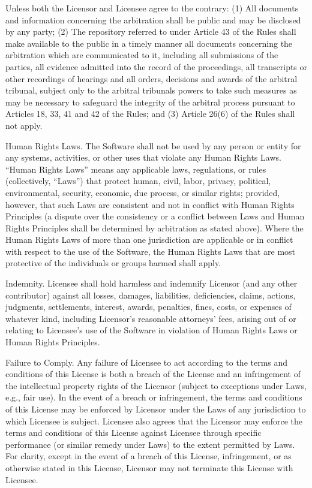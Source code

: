 \begin{DoxyItemize}
\begin{DoxyEnumerate}
Unless both the Licensor and Licensee agree to the contrary:\+ (1) All documents and information concerning the arbitration shall be public and may be disclosed by any party; (2) The repository referred to under Article 43 of the Rules shall make available to the public in a timely manner all documents concerning the arbitration which are communicated to it, including all submissions of the parties, all evidence admitted into the record of the proceedings, all transcripts or other recordings of hearings and all orders, decisions and awards of the arbitral tribunal, subject only to the arbitral tribunal\textquotesingle{}s powers to take such measures as may be necessary to safeguard the integrity of the arbitral process pursuant to Articles 18, 33, 41 and 42 of the Rules; and (3) Article 26(6) of the Rules shall not apply.
\item Human Rights Laws. The Software shall not be used by any person or entity for any systems, activities, or other uses that violate any Human Rights Laws. “\+Human Rights Laws” means any applicable laws, regulations, or rules (collectively, “\+Laws”) that protect human, civil, labor, privacy, political, environmental, security, economic, due process, or similar rights; provided, however, that such Laws are consistent and not in conflict with Human Rights Principles (a dispute over the consistency or a conflict between Laws and Human Rights Principles shall be determined by arbitration as stated above). Where the Human Rights Laws of more than one jurisdiction are applicable or in conflict with respect to the use of the Software, the Human Rights Laws that are most protective of the individuals or groups harmed shall apply.
\item Indemnity. Licensee shall hold harmless and indemnify Licensor (and any other contributor) against all losses, damages, liabilities, deficiencies, claims, actions, judgments, settlements, interest, awards, penalties, fines, costs, or expenses of whatever kind, including Licensor’s reasonable attorneys’ fees, arising out of or relating to Licensee’s use of the Software in violation of Human Rights Laws or Human Rights Principles.
\end{DoxyEnumerate}
\item Failure to Comply. Any failure of Licensee to act according to the terms and conditions of this License is both a breach of the License and an infringement of the intellectual property rights of the Licensor (subject to exceptions under Laws, e.\+g., fair use). In the event of a breach or infringement, the terms and conditions of this License may be enforced by Licensor under the Laws of any jurisdiction to which Licensee is subject. Licensee also agrees that the Licensor may enforce the terms and conditions of this License against Licensee through specific performance (or similar remedy under Laws) to the extent permitted by Laws. For clarity, except in the event of a breach of this License, infringement, or as otherwise stated in this License, Licensor may not terminate this License with Licensee.

\end{DoxyItemize}
